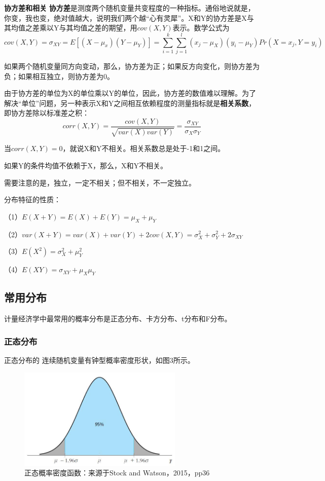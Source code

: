 \documentclass[cn,12pt,math=newtx,citestyle=gb7714-2015,bibstyle=gb7714-2015]{elegantbook}
\begin{document}
	\textbf{协方差和相关}
	\textbf{协方差}是测度两个随机变量共变程度的一种指标。通俗地说就是，你变，我也变，绝对值越大，说明我们两个越“心有灵犀”。X和Y的协方差是X与其均值之差乘以Y与其均值之差的期望，用$cov(X,Y)$表示。数学公式为
	\begin{equation}
		cov(X,Y)=\sigma_{XY}=E[(X-\mu_x)(Y-\mu_Y)]=\sum_{i=1}^{k}{\sum_{j=1}^{l}{(x_j-\mu_X)(y_i-\mu_Y)Pr(X=x_j,Y=y_i)}}
	\end{equation}
	
	如果两个随机变量同方向变动，那么，协方差为正；如果反方向变化，则协方差为负；如果相互独立，则协方差为0。
	
	由于协方差的单位为X的单位乘以Y的单位，因此，协方差的数值难以理解。为了解决“单位”问题，另一种表示X和Y之间相互依赖程度的测量指标就是\textbf{相关系数}，即协方差除以标准差之积：
	\begin{equation}
		corr(X,Y)=\frac{cov(X,Y)}{\sqrt{var(X)var(Y)}}=\frac{\sigma_{XY}}{\sigma_X\sigma_Y}
	\end{equation}
	
	当$corr(X,Y)=0$，就说X和Y不相关。相关系数总是处于-1和1之间。
	
	如果Y的条件均值不依赖于X，那么，X和Y不相关。
	
	需要注意的是，独立，一定不相关；但不相关，不一定独立。
	
	分布特征的性质：
	
	（1）$E(X+Y)=E(X)+E(Y)=\mu_X+\mu_Y$
	
	（2）$var(X+Y)=var(X)+var(Y)+2cov(X,Y)=\sigma_{X}^2+\sigma_{Y}^2+2\sigma_{XY}$
	
	（3）$E(X^2)=\sigma_X^2+\mu_Y^2$
	
	（4）$E(XY)=\sigma_{XY}+\mu_X\mu_Y$
	
	\subsection{常用分布}
	计量经济学中最常用的概率分布是正态分布、卡方分布、t分布和F分布。
	
	\subsubsection{正态分布}
	正态分布的 连续随机变量有钟型概率密度形状，如图3所示。
		\begin{figure}[htbp]
		\centering
		\includegraphics[width=0.7\textwidth]{normal.jpg}
		\caption{正态概率密度函数：来源于Stock and Watson，2015，pp36}\label{fig:digit}
	\end{figure}
	
\end{document}
